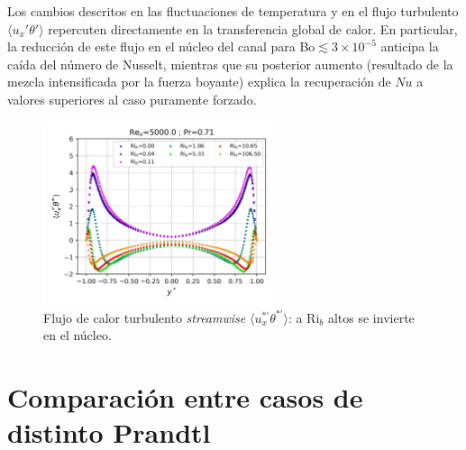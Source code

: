 Los cambios descritos en las fluctuaciones de temperatura y en el flujo turbulento $\langle u_x'\theta'\rangle$ repercuten directamente en la transferencia global de calor. En particular, la reducción de este flujo en el núcleo del canal para Bo$\lesssim3\times10^{-5}$ anticipa la caída del número de Nusselt, mientras que su posterior aumento (resultado de la mezcla intensificada por la fuerza boyante) explica la recuperación de $Nu$ a valores superiores al caso puramente forzado.

\begin{figure}[H]
\centering
\includegraphics[width=0.6\textwidth]{figures/cap5/Re5000-Pr071/uphif_profile.png}
\caption{Flujo de calor turbulento \textit{streamwise} $\langle u^{*'}_x \theta^{*'} \rangle$: a Ri$_b$ altos se invierte en el núcleo.}
\label{fig:uxphi_f-Re5000-Pr071}
\end{figure}


\section{Comparación entre casos de distinto Prandtl}


